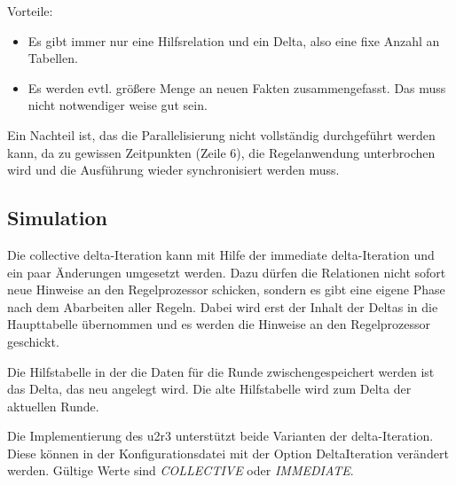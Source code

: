 Vorteile:
\begin{itemize}
  \item Es gibt immer nur eine Hilfsrelation und ein Delta, also eine fixe Anzahl an Tabellen.
  \item Es werden evtl. größere Menge an neuen Fakten zusammengefasst. Das muss nicht notwendiger weise gut sein.
\end{itemize}

Ein Nachteil ist, das die Parallelisierung nicht vollständig durchgeführt werden kann, da zu gewissen Zeitpunkten (Zeile 6), die Regelanwendung unterbrochen wird und die Ausführung wieder synchronisiert werden muss.

\subsection{Simulation}

Die collective delta-Iteration kann mit Hilfe der immediate delta-Iteration und ein paar Änderungen umgesetzt werden. Dazu dürfen die Relationen nicht sofort neue Hinweise an den Regelprozessor schicken, sondern es gibt eine eigene Phase nach dem Abarbeiten aller Regeln. Dabei wird erst der Inhalt der Deltas in die Haupttabelle übernommen und es werden die Hinweise an den Regelprozessor geschickt.

Die Hilfstabelle in der die Daten für die Runde zwischengespeichert werden ist das Delta, das neu angelegt wird. Die alte Hilfstabelle wird zum Delta der aktuellen Runde.

Die Implementierung des u2r3 unterstützt beide Varianten der delta-Iteration. Diese können in der Konfigurationsdatei mit der Option DeltaIteration verändert werden. Gültige Werte sind \emph{COLLECTIVE} oder \emph{IMMEDIATE}.
